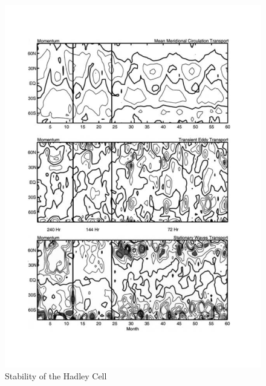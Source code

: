 \begin{figure}
\centering
\includegraphics[width = .7 \textwidth]{figs/GD/Rot2.png}
\caption{Stability of the Hadley Cell}
\label{fig:}
\end{figure}


